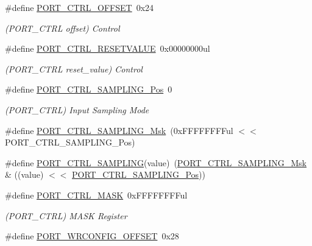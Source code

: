 \begin{DoxyCompactItemize}
\#define \mbox{\hyperlink{group___s_a_m_d21___p_o_r_t_ga3a53a2a2a7695aa20f7827ceafcec8d5}{P\+O\+R\+T\+\_\+\+C\+T\+R\+L\+\_\+\+O\+F\+F\+S\+ET}}~0x24
\begin{DoxyCompactList}\small\item\em (P\+O\+R\+T\+\_\+\+C\+T\+RL offset) Control \end{DoxyCompactList}\item 
\#define \mbox{\hyperlink{group___s_a_m_d21___p_o_r_t_ga24912324fee45dc65e6d91dce8b908c3}{P\+O\+R\+T\+\_\+\+C\+T\+R\+L\+\_\+\+R\+E\+S\+E\+T\+V\+A\+L\+UE}}~0x00000000ul
\begin{DoxyCompactList}\small\item\em (P\+O\+R\+T\+\_\+\+C\+T\+RL reset\+\_\+value) Control \end{DoxyCompactList}\item 
\#define \mbox{\hyperlink{group___s_a_m_d21___p_o_r_t_gaf27535115d3c255e443dbe76e1e1a03c}{P\+O\+R\+T\+\_\+\+C\+T\+R\+L\+\_\+\+S\+A\+M\+P\+L\+I\+N\+G\+\_\+\+Pos}}~0
\begin{DoxyCompactList}\small\item\em (P\+O\+R\+T\+\_\+\+C\+T\+RL) Input Sampling Mode \end{DoxyCompactList}\item 
\#define \mbox{\hyperlink{group___s_a_m_d21___p_o_r_t_ga1ca0c4a14f1f5fdcecb663287a093638}{P\+O\+R\+T\+\_\+\+C\+T\+R\+L\+\_\+\+S\+A\+M\+P\+L\+I\+N\+G\+\_\+\+Msk}}~(0x\+F\+F\+F\+F\+F\+F\+F\+Ful $<$$<$ P\+O\+R\+T\+\_\+\+C\+T\+R\+L\+\_\+\+S\+A\+M\+P\+L\+I\+N\+G\+\_\+\+Pos)
\item 
\#define \mbox{\hyperlink{group___s_a_m_d21___p_o_r_t_ga8992de32f5013d24b45021d6e972ff87}{P\+O\+R\+T\+\_\+\+C\+T\+R\+L\+\_\+\+S\+A\+M\+P\+L\+I\+NG}}(value)~(\mbox{\hyperlink{group___s_a_m_d21___p_o_r_t_ga1ca0c4a14f1f5fdcecb663287a093638}{P\+O\+R\+T\+\_\+\+C\+T\+R\+L\+\_\+\+S\+A\+M\+P\+L\+I\+N\+G\+\_\+\+Msk}} \& ((value) $<$$<$ \mbox{\hyperlink{group___s_a_m_d21___p_o_r_t_gaf27535115d3c255e443dbe76e1e1a03c}{P\+O\+R\+T\+\_\+\+C\+T\+R\+L\+\_\+\+S\+A\+M\+P\+L\+I\+N\+G\+\_\+\+Pos}}))
\item 
\#define \mbox{\hyperlink{group___s_a_m_d21___p_o_r_t_ga9c5aed68de5b7c9dd9239edbd64af23b}{P\+O\+R\+T\+\_\+\+C\+T\+R\+L\+\_\+\+M\+A\+SK}}~0x\+F\+F\+F\+F\+F\+F\+F\+Ful
\begin{DoxyCompactList}\small\item\em (P\+O\+R\+T\+\_\+\+C\+T\+RL) M\+A\+SK Register \end{DoxyCompactList}\item 
\#define \mbox{\hyperlink{group___s_a_m_d21___p_o_r_t_ga9d707b59cf1ecab326071c79a1334f67}{P\+O\+R\+T\+\_\+\+W\+R\+C\+O\+N\+F\+I\+G\+\_\+\+O\+F\+F\+S\+ET}}~0x28

\end{DoxyCompactItemize}
